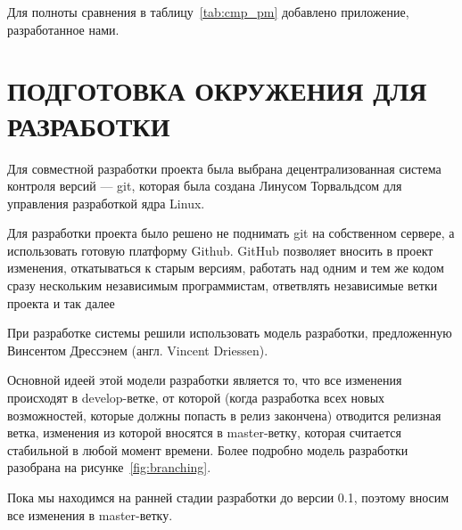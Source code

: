 \documentclass[14pt, a4paper]{extreport}
\begin{document}
Для полноты сравнения в таблицу~\ref{tab:cmp_pm} добавлено приложение, разработанное нами.

\newpage

\chapter{\MakeTextUppercase{Подготовка окружения для разработки}}
Для совместной разработки проекта была выбрана децентрализованная система контроля
версий --- git, которая была создана Линусом Торвальдсом для управления разработкой
ядра Linux.~\cite{git_home}

Для разработки проекта было решено не поднимать git на собственном сервере, а использовать
готовую платформу Github. GitHub позволяет вносить в проект изменения, откатываться
к старым версиям, работать над одним и тем же кодом сразу нескольким независимым программистам,
ответвлять независимые ветки проекта и так далее

При разработке системы решили использовать модель разработки, предложенную Винсентом
Дрессэнем (англ. Vincent Driessen).~\cite{git_branching_model}

Основной идеей этой модели разработки является то, что все изменения происходят в
develop-ветке, от которой (когда разработка всех новых возможностей, которые
должны попасть в релиз закончена) отводится релизная ветка, изменения из которой
вносятся в master-ветку, которая считается стабильной в любой момент времени.
Более подробно модель разработки разобрана на рисунке~\ref{fig:branching}.

Пока мы находимся на ранней стадии разработки до версии 0.1, поэтому вносим все изменения
в master-ветку. %
\end{document}
